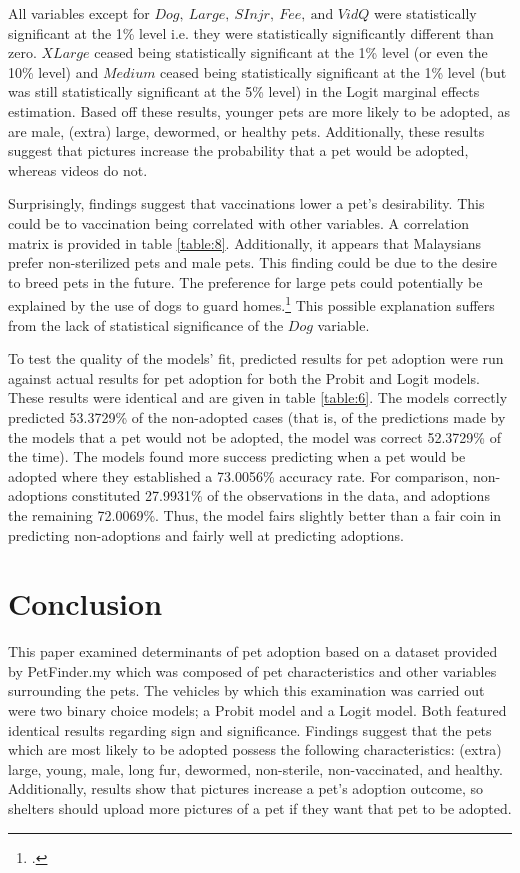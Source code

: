 \documentclass[12pt]{article}
\begin{document}
		All variables except for $ Dog,\ Large,\ SInjr,\ Fee,\ \text{and } VidQ $ were statistically significant at the 1\% level i.e. they were statistically significantly different than zero. $ XLarge $ ceased being statistically significant at the 1\% level (or even the 10\% level) and $ Medium $ ceased being statistically significant at the 1\% level (but was still statistically significant at the 5\% level) in the Logit marginal effects estimation. Based off these results, younger pets are more likely to be adopted, as are male, (extra) large, dewormed, or healthy pets. Additionally, these results suggest that pictures increase the probability that a pet would be adopted, whereas videos do not. 
		
		Surprisingly, findings suggest that vaccinations lower a pet's desirability. This could be to vaccination being correlated with other variables. A correlation matrix is provided in table \ref{table:8}. Additionally, it appears that Malaysians prefer non-sterilized pets and male pets. This finding could be due to the desire to breed pets in the future. The preference for large pets could potentially be explained by the use of dogs to guard homes.\footcite{guard} This possible explanation suffers from the lack of statistical significance of the $ Dog $ variable. 
		
		To test the quality of the models' fit, predicted results for pet adoption were run against actual results for pet adoption for both the Probit and Logit models. These results were identical and are given in table \ref{table:6}. The models correctly predicted 53.3729\% of the non-adopted cases (that is, of the predictions made by the models that a pet would not be adopted, the model was correct 52.3729\% of the time). The models found more success predicting when a pet would be adopted where they established a 73.0056\% accuracy rate. For comparison, non-adoptions constituted 27.9931\% of the observations in the data, and adoptions the remaining 72.0069\%. Thus, the model fairs slightly better than a fair coin in predicting non-adoptions and fairly well at predicting adoptions. 
				
	\section{Conclusion}
		This paper examined determinants of pet adoption based on a dataset provided by PetFinder.my which was composed of pet characteristics and other variables surrounding the pets. The vehicles by which this examination was carried out were two binary choice models; a Probit model and a Logit model. Both featured identical results regarding sign and significance. Findings suggest that the pets which are most likely to be adopted possess the following characteristics: (extra) large, young, male, long fur, dewormed, non-sterile, non-vaccinated, and healthy. Additionally, results show that pictures increase a pet's adoption outcome, so shelters should upload more pictures of a pet if they want that pet to be adopted. 
		
\end{document}
